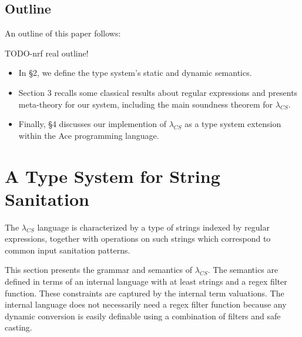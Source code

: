 \documentclass[10pt,preprint]{sigplanconf}
\theoremstyle{definition}
\newcommand{\lcs}{\lambda_{CS}}
\begin{document}
\subsection{Outline}

An outline of this paper follows:

TODO-nrf real outline!
\begin{itemize}
  \item In \S 2, we define the type system's static and dynamic semantics.
  \item Section 3 recalls some classical results about regular expressions and presents meta-theory for our system, including
    the main soundness theorem for $\lcs$.
  \item Finally, \S 4 discusses our implemention of $\lcs$ as a type system extension  within the Ace programming language.
\end{itemize}

\section{A Type System for String Sanitation}

The $\lcs$ language is characterized by a type of strings indexed by regular
expressions, together with operations on such strings which correspond to common
input sanitation patterns.

This section presents the grammar and semantics of $\lcs$.
The semantics are defined in terms of an internal language with at least strings and a regex filter function.
These constraints are captured by the internal term valuations.
The internal language does not necessarily need a regex filter function because
any dynamic conversion is easily definable using a combination of filters and safe
casting.
\end{document}
